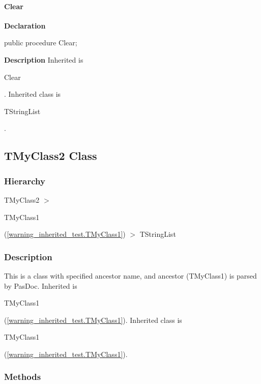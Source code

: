 \documentclass{report}
\begin{document}
\paragraph*{Clear}\hspace*{\fill}

\begin{list}{}{
\setlength{\itemindent}{0cm}
\setlength{\listparindent}{0cm}
\setlength{\leftmargin}{\evensidemargin}
\addtolength{\leftmargin}{\tmplength}
\settowidth{\labelsep}{X}
\addtolength{\leftmargin}{\labelsep}
\setlength{\labelwidth}{\tmplength}
}
\begin{flushleft}
\item[\textbf{Declaration}\hfill]
\begin{ttfamily}
public procedure Clear;\end{ttfamily}


\end{flushleft}
\par
\item[\textbf{Description}]
Inherited is \begin{ttfamily}Clear\end{ttfamily}. Inherited class is \begin{ttfamily}TStringList\end{ttfamily}.

\end{list}
\subsection*{TMyClass2 Class}
\subsubsection*{\large{\textbf{Hierarchy}}\normalsize\hspace{1ex}\hfill}
TMyClass2 {$>$} \begin{ttfamily}TMyClass1\end{ttfamily}(\ref{warning_inherited_test.TMyClass1}) {$>$} 
TStringList
\subsubsection*{\large{\textbf{Description}}\normalsize\hspace{1ex}\hfill}
This is a class with specified ancestor name, and ancestor (TMyClass1) is parsed by PasDoc. Inherited is \begin{ttfamily}TMyClass1\end{ttfamily}(\ref{warning_inherited_test.TMyClass1}). Inherited class is \begin{ttfamily}TMyClass1\end{ttfamily}(\ref{warning_inherited_test.TMyClass1}).\subsubsection*{\large{\textbf{Methods}}\normalsize\hspace{1ex}\hfill}
\end{document}
